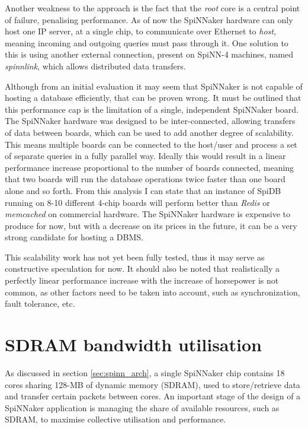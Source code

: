 Another weakness to the approach is the fact that the \textit{root} core is a central point of failure, penalising performance. As of now the SpiNNaker hardware can only host one IP server, at a single chip, to communicate over Ethernet to \textit{host}, meaning incoming and outgoing queries must pass through it. One solution to this is using another external connection, present on SpiNN-4 machines, named \textit{spinnlink}, which allows distributed data transfers.

Although from an initial evaluation it may seem that SpiNNaker is not capable of hosting a database efficiently, that can be proven wrong. It must be outlined that this performance cap is the limitation of a single, independent SpiNNaker board. The SpiNNaker hardware was designed to be inter-connected, allowing transfers of data between boards, which can be used to add another degree of scalability. This means multiple boards can be connected to the host/user and process a set of separate queries in a fully parallel way. Ideally this would result in a linear performance increase proportional to the number of boards connected, meaning that two boards will run the database operations twice faster than one board alone and so forth. From this analysis I can state that an instance of SpiDB running on 8-10 different 4-chip boards will perform better than \textit{Redis} or \textit{memcached} on commercial hardware. The SpiNNaker hardware is expensive to produce for now, but with a decrease on its prices in the future, it can be a very strong candidate for hosting a DBMS.

This scalability work has not yet been fully tested, thus it may serve as constructive speculation for now. It should also be noted that realistically a perfectly linear performance increase with the increase of horsepower is not common, as other factors need to be taken into account, such as synchronization, fault tolerance, etc.


\section{SDRAM bandwidth utilisation}
\label{sec:limitations}
As discussed in section \ref{sec:spinn_arch}, a single SpiNNaker chip contains 18 cores sharing 128-MB of dynamic memory (SDRAM), used to store/retrieve data and transfer certain packets between cores. An important stage of the design of a SpiNNaker application is managing the share of available resources, such as SDRAM, to maximise collective utilisation and performance.

